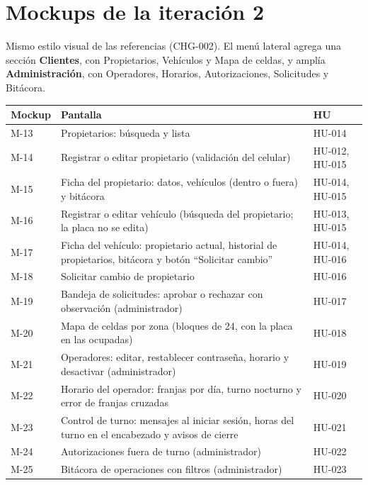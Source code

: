 \section{Mockups de la iteración 2}


Mismo estilo visual de las referencias (CHG-002). El menú lateral agrega una sección \textbf{Clientes}, con Propietarios, Vehículos y Mapa de celdas, y amplía \textbf{Administración}, con Operadores, Horarios, Autorizaciones, Solicitudes y Bitácora.


\begin{longtable}{>{\raggedright\arraybackslash}p{1.5cm}>{\raggedright\arraybackslash}p{11.4cm}>{\raggedright\arraybackslash}p{1.5cm}}
\toprule
\textbf{Mockup} & \textbf{Pantalla} & \textbf{HU}\\
\midrule\endhead
M-13 & Propietarios: búsqueda y lista & HU-014\\
M-14 & Registrar o editar propietario (validación del celular) & HU-012, HU-015\\
M-15 & Ficha del propietario: datos, vehículos (dentro o fuera) y bitácora & HU-014, HU-015\\
M-16 & Registrar o editar vehículo (búsqueda del propietario; la placa no se edita) & HU-013, HU-015\\
M-17 & Ficha del vehículo: propietario actual, historial de propietarios, bitácora y botón ``Solicitar cambio'' & HU-014, HU-016\\
M-18 & Solicitar cambio de propietario & HU-016\\
M-19 & Bandeja de solicitudes: aprobar o rechazar con observación (administrador) & HU-017\\
M-20 & Mapa de celdas por zona (bloques de 24, con la placa en las ocupadas) & HU-018\\
M-21 & Operadores: editar, restablecer contraseña, horario y desactivar (administrador) & HU-019\\
M-22 & Horario del operador: franjas por día, turno nocturno y error de franjas cruzadas & HU-020\\
M-23 & Control de turno: mensajes al iniciar sesión, horas del turno en el encabezado y avisos de cierre & HU-021\\
M-24 & Autorizaciones fuera de turno (administrador) & HU-022\\
M-25 & Bitácora de operaciones con filtros (administrador) & HU-023\\
\bottomrule
\end{longtable}




